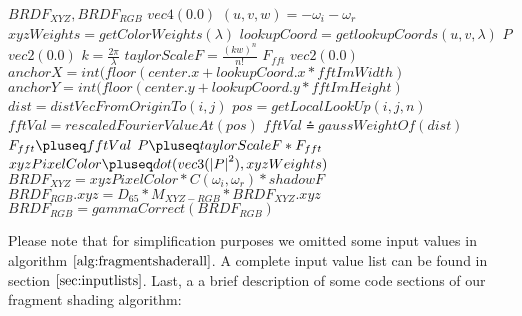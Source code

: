 \begin{algorithm}[H]
  \setlength{\fboxrule}{0pt} 
  \begin{boxedminipage}{1.0\textwidth}
  \begin{algorithmic}[1]
      \State \init $BRDF_{XYZ}, BRDF_{RGB}$ \myto $vec4(0.0)$
      \State $(u,v,w) = -\omega_i - \omega_r$
        \State $xyzWeights = getColorWeights(\lambda)$
        \State $lookupCoord = getlookupCoords(u, v, \lambda)$
        \State \init $P$ \myto $vec2(0.0)$
        \State $k = \frac{2\pi}{\lambda}$
          \State $taylorScaleF = \frac{(kw)^n}{n!}$
          \State \init $F_{fft}$  \myto $vec2(0.0)$
          \State $anchorX = int(floor(center.x + lookupCoord.x * fftImWidth)$
          \State $anchorY = int(floor(center.y + lookupCoord.y * fftImHeight)$
              \State $dist = distVecFromOriginTo(i,j)$
              \State $pos = getLocalLookUp(i,j,n)$
              \State $fftVal = rescaledFourierValueAt(pos)$
              \State $fftVal \asteq gaussWeightOf(dist)$
              \State $F_{fft} \pluseq fftVal$
            \EndFor
          \EndFor
          \State $P \pluseq taylorScaleF*F_{fft}$
        \EndFor
        \State $xyzPixelColor \pluseq dot(vec3(\left|P\right|^2), xyzWeights)$
      \EndFor
      \State $BRDF_{XYZ} = xyzPixelColor*C(\omega_i, \omega_r)*shadowF$
      \State $BRDF_{RGB}.xyz = D_{65}*M_{XYZ-RGB}*BRDF_{XYZ}.xyz$
      \State $BRDF_{RGB}= gammaCorrect(BRDF_{RGB})$
    \EndFor
  \end{algorithmic}
  \end{boxedminipage}
  \vskip1.5pt
  \label{alg:fragmentshaderall}
\end{algorithm}

Please note that for simplification purposes we omitted some input values in algorithm $\ref{alg:fragmentshaderall}$. A complete input value list can be found in section $\ref{sec:inputlists}$. Last, a a brief description of some code sections of our fragment shading algorithm:

